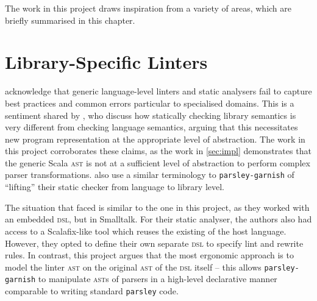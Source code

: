 \documentclass[../../main.tex]{subfiles}
\begin{document}
The work in this project draws inspiration from a variety of areas, which are briefly summarised in this chapter.

\section{Library-Specific Linters}
\textcite{renggli_domain-specific_2010} acknowledge that generic language-level linters and static analysers fail to capture best practices and common errors particular to specialised domains.
This is a sentiment shared by \textcite{gregor_stllint_2006}, who discuss how statically checking library semantics is very different from checking language semantics, arguing that this necessitates new program representation at the appropriate level of abstraction.
The work in this project corroborates these claims, as the work in \cref{sec:impl} demonstrates that the generic Scala \textsc{ast} is not at a sufficient level of abstraction to perform complex parser transformations.
\textcite{gregor_stllint_2006} also use a similar terminology to \texttt{parsley-garnish} of ``lifting'' their static checker from language to library level.

The situation that \textcite{renggli_domain-specific_2010} faced is similar to the one in this project, as they worked with an embedded \textsc{dsl}, but in Smalltalk.
For their static analyser, the authors also had access to a Scalafix-like tool which reuses the existing  of the host language.
However, they opted to define their own separate \textsc{dsl} to specify lint and rewrite rules.
In contrast, this project argues that the most ergonomic approach is to model the linter \textsc{ast} on the original \textsc{ast} of the \textsc{dsl} itself -- this allows \texttt{parsley-garnish} to manipulate \textsc{ast}s of parsers in a high-level declarative manner comparable to writing standard \texttt{parsley} code.

\end{document}
